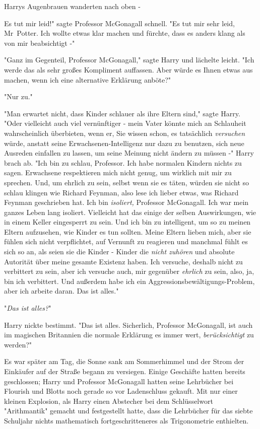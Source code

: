 {Harrys Augenbrauen wanderten nach oben -

Es tut mir leid!" sagte Professor McGonagall schnell. "Es tut mir sehr leid, Mr~Potter. Ich wollte etwas klar machen und fürchte, dass es anders klang als von mir beabsichtigt -"

"Ganz im Gegenteil, Professor McGonagall," sagte Harry und lächelte leicht. "Ich werde das als sehr großes Kompliment auffassen. Aber würde es Ihnen etwas aus machen, wenn ich eine alternative Erklärung anböte?"

"Nur zu."

"Man erwartet nicht, dass Kinder schlauer als ihre Eltern sind," sagte Harry. "Oder vielleicht auch viel vernünftiger - mein Vater könnte mich an Schlauheit wahrscheinlich überbieten, wenn er, Sie wissen schon, es tatsächlich \emph{versuchen} würde, anstatt seine Erwachsenen-Intelligenz nur dazu zu benutzen, sich neue Ausreden einfallen zu lassen, um seine Meinung nicht ändern zu müssen -" Harry brach ab. "Ich bin zu schlau, Professor. Ich habe normalen Kindern nichts zu sagen. Erwachsene respektieren mich nicht genug, um wirklich mit mir zu sprechen. Und, um ehrlich zu sein, selbst wenn sie es täten, würden sie nicht so schlau klingen wie Richard Feynman, also lese ich lieber etwas, was Richard Feynman geschrieben hat. Ich bin \emph{isoliert,} Professor McGonagall. Ich war mein ganzes Leben lang isoliert. Vielleicht hat das einige der selben Auswirkungen, wie in einem Keller eingesperrt zu sein. Und ich bin zu intelligent, um so zu meinen Eltern aufzusehen, wie Kinder es tun sollten. Meine Eltern lieben mich, aber sie fühlen sich nicht verpflichtet, auf Vernunft zu reagieren und manchmal fühlt es sich so an, als seien sie die Kinder - Kinder die \emph{nicht zuhören} und absolute Autorität über meine gesamte Existenz haben. Ich versuche, deshalb nicht zu verbittert zu sein, aber ich versuche auch, mir gegenüber \emph{ehrlich} zu sein, also, ja, bin ich verbittert. Und außerdem habe ich ein Aggressionsbewältigungs-Problem, aber ich arbeite daran. Das ist alles."

"\emph{Das ist alles?}"

Harry nickte bestimmt. "Das ist alles. Sicherlich, Professor McGonagall, ist auch im magischen Britannien die normale Erklärung es immer wert, \emph{berücksichtigt} zu werden?"

\later

Es war später am Tag, die Sonne sank am Sommerhimmel und der Strom der Einkäufer auf der Straße begann zu versiegen. Einige Geschäfte hatten bereits geschlossen; Harry und Professor McGonagall hatten seine Lehrbücher bei Flourish und Blotts noch gerade so vor Ladenschluss gekauft. Mit nur einer kleinen Explosion, als Harry einen Abstecher bei dem Schlüsselwort "Arithmantik" gemacht und festgestellt hatte, dass die Lehrbücher für das siebte Schuljahr nichts mathematisch fortgeschritteneres als Trigonometrie enthielten.

}
